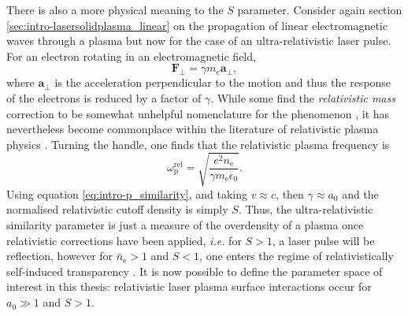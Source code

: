There is also a more physical meaning to the $S$ parameter. Consider again section \ref{sec:intro-lasersolidplasma_linear} on the propagation of linear electromagnetic waves through a plasma but now for the case of an ultra-relativistic laser pulse. For an electron rotating in an electromagnetic field,
\begin{equation}
	\mathbf{F}_\perp = \gamma m_e \mathbf{a}_\perp,
\end{equation}
where $ \mathbf{a}_\perp$ is the acceleration perpendicular to the motion and thus the response of the electrons is reduced by a factor of $\gamma$. While some find the \textit{relativistic mass} correction to be somewhat unhelpful nomenclature for the phenomenon \cite{steaneRelativityMadeRelatively2012}, it has nevertheless become commonplace within the literature of relativistic plasma physics \cite{umstadterRelativisticLaserPlasma2003a}. Turning the handle, one finds that the relativistic plasma frequency is
\begin{equation}
	\omega_\mathrm{p}^\mathrm{rel} = \sqrt{\frac{e^2n_\mathrm{e}}{\gamma m_\mathrm{e} \epsilon_0}}.
\end{equation}
Using equation \ref{eq:intro-p_similarity}, and taking $v \approx c$, then $\gamma \approx a_0$ and the normalised relativistic cutoff density is simply $S$. Thus, the ultra-relativistic similarity parameter is just a measure of the overdensity of a plasma once relativistic corrections have been applied, \textit{i.e.} for $S>1$, a laser pulse will be reflection, however for $\bar{n}_\mathrm{e} > 1$ and $S <1$, one enters the regime of relativistically self-induced transparency \cite{ereminRelativisticSelfInducedTransparency2010}. It is now possible to define the parameter space of interest in this thesis: relativistic laser plasma surface interactions occur for $a_0 \gg 1$ and $S > 1$.

